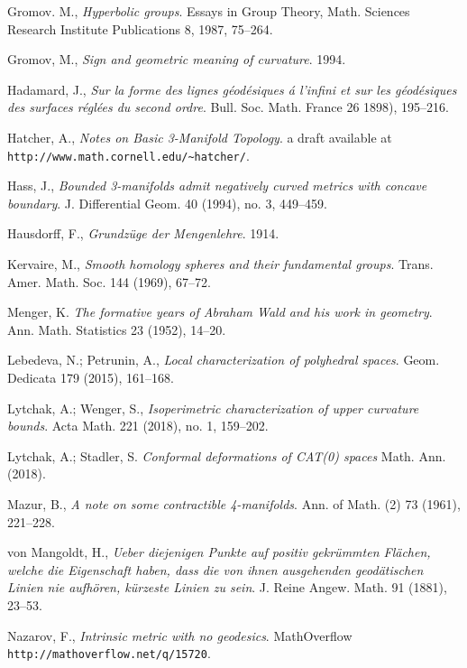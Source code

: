 \begin{thebibliography}{52}
Gromov. M.,
\textit{Hyperbolic groups}. 
Essays in Group Theory,
Math. Sciences Research Institute Publications 8,
1987, 75--264.

Gromov, M.,
\textit{Sign and geometric meaning of curvature}.
1994.

Hadamard, J.,
\textit{Sur la forme des lignes g\'eod\'esiques \'a l'infini et sur les g\'eod\'esiques des surfaces r\'egl\'ees du second ordre}.
Bull. Soc. Math. France 
26 
1898), 
195--216.

Hatcher, A., 
\textit{Notes on Basic 3-Manifold Topology}.
a draft available at \verb+http://www.math.cornell.edu/~hatcher/+.

Hass, J.,
\textit{Bounded 3-manifolds admit negatively curved metrics with concave boundary}.
J. Differential Geom. 
40 (1994), 
no. 3, 
449--459. 

Hausdorff, F., 
\textit{Grundz\"uge der Mengenlehre}. 
1914.

Kervaire, M., 
\textit{Smooth homology spheres and their fundamental groups}.
Trans. Amer. Math. Soc. 
144 
(1969),
67--72.

Menger, K.
\textit{The formative years of Abraham Wald and his work in geometry}.
Ann. Math. Statistics 23 (1952), 14--20.

Lebedeva, N.; 
Petrunin, A., 
\textit{Local characterization of polyhedral spaces}.
Geom. Dedicata 179 (2015), 161--168.

Lytchak, A.; Wenger, S.,
\textit{Isoperimetric characterization of upper curvature bounds}.
Acta Math. 221 (2018), no. 1, 159--202.

Lytchak, A.; Stadler, S. 
\textit{Conformal deformations of CAT(0) spaces}
Math. Ann. (2018). 

Mazur, B.,
\textit{A note on some contractible 4-manifolds}.
Ann. of Math. (2) 
73 
(1961),
221--228.

von Mangoldt, H., 
\textit{Ueber diejenigen Punkte auf positiv gekr\"ummten Fl\"achen, welche die Eigenschaft haben, dass die von ihnen ausgehenden geod\"atischen Linien nie aufh\"oren, k\"urzeste Linien zu sein}.
J. Reine Angew. Math. 91 (1881), 23--53.

Nazarov, F.,
\textit{Intrinsic metric with no geodesics}.
MathOverflow \texttt{http://mathoverflow.net/q/15720}.


\end{thebibliography}
